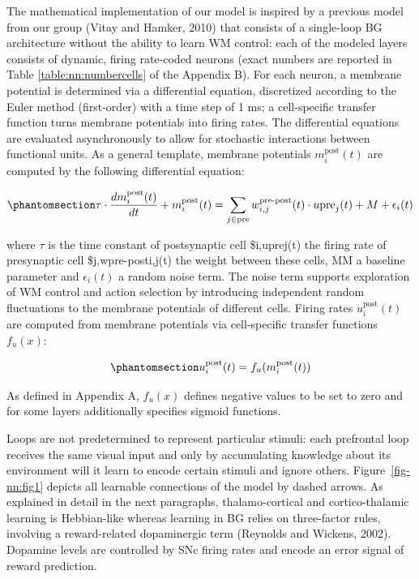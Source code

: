 \documentclass[
  11pt,
  a4paper,
]{scrbook}
\begin{document}
The mathematical implementation of our model is inspired by a previous
model from our group (Vitay and Hamker, 2010) that consists of a
single-loop BG architecture without the ability to learn WM control:
each of the modeled layers consists of dynamic, firing rate-coded
neurons (exact numbers are reported in Table \ref{table:nn:numbercells}
of the Appendix B). For each neuron, a membrane potential is determined
via a differential equation, discretized according to the Euler method
(first-order) with a time step of 1 ms; a cell-specific transfer
function turns membrane potentials into firing rates. The differential
equations are evaluated asynchronously to allow for stochastic
interactions between functional units. As a general template, membrane
potentials \(m^\text{post}_i(t)\) are computed by the following
differential equation:

\begin{equation}\phantomsection\label{eq-nn:mp}{
    \tau \cdot \frac{d m^\text{post}_i(t)}{dt} + m^\text{post}_i(t) = \sum_{j \in \text{pre}} w_{i,j}^\text{pre-post}(t) \cdot u\text{pre}_j(t) + M + \epsilon_i(t)
}\end{equation}

where \(\tau\) is the time constant of postsynaptic cell \$i,uprej(t)
the firing rate of presynaptic cell \$j,wpre-posti,j(t) the weight
between these cells, MM a baseline parameter and \(\epsilon_i(t)\) a
random noise term. The noise term supports exploration of WM control and
action selection by introducing independent random fluctuations to the
membrane potentials of different cells. Firing rates
\(u^\text{post}_i(t)\) are computed from membrane potentials via
cell-specific transfer functions \(f_u(x)\):

\begin{equation}\phantomsection\label{eq-nn:u}{
    u^\text{post}_i(t)=f_u(m^\text{post}_i(t))
}\end{equation}

As defined in Appendix A, \(f_u(x)\) defines negative values to be set
to zero and for some layers additionally specifies sigmoid functions.

Loops are not predetermined to represent particular stimuli: each
prefrontal loop receives the same visual input and only by accumulating
knowledge about its environment will it learn to encode certain stimuli
and ignore others. Figure~\ref{fig-nn:fig1} depicts all learnable
connections of the model by dashed arrows. As explained in detail in the
next paragraphs, thalamo-cortical and cortico-thalamic learning is
Hebbian-like whereas learning in BG relies on three-factor rules,
involving a reward-related dopaminergic term (Reynolds and Wickens,
2002). Dopamine levels are controlled by SNc firing rates and encode an
error signal of reward prediction.
\end{document}
